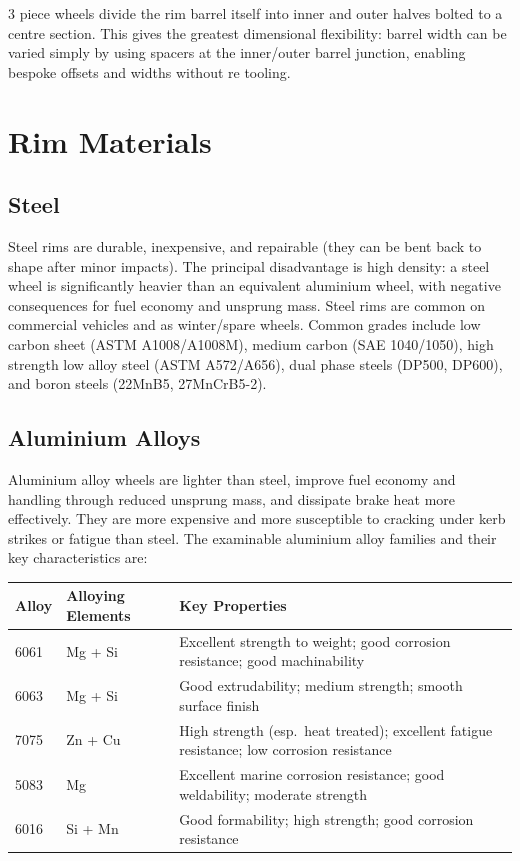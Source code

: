 \documentclass[10pt,a4paper]{article}
\begin{document}
3 piece wheels divide the rim barrel itself into inner and outer halves bolted to a centre section. This gives the greatest dimensional flexibility: barrel width can be varied simply by using spacers at the inner/outer barrel junction, enabling bespoke offsets and widths without re tooling.

\section{Rim Materials}

\subsection{Steel}

Steel rims are durable, inexpensive, and repairable (they can be bent back to shape after minor impacts). The principal disadvantage is high density: a steel wheel is significantly heavier than an equivalent aluminium wheel, with negative consequences for fuel economy and unsprung mass. Steel rims are common on commercial vehicles and as winter/spare wheels. Common grades include low carbon sheet (ASTM A1008/A1008M), medium carbon (SAE 1040/1050), high strength low alloy steel (ASTM A572/A656), dual phase steels (DP500, DP600), and boron steels (22MnB5, 27MnCrB5-2).

\subsection{Aluminium Alloys}

Aluminium alloy wheels are lighter than steel, improve fuel economy and handling through reduced unsprung mass, and dissipate brake heat more effectively. They are more expensive and more susceptible to cracking under kerb strikes or fatigue than steel. The examinable aluminium alloy families and their key characteristics are:

\begin{center}\small
\begin{tabular}{@{}lll@{}}
\toprule
Alloy & Alloying Elements & Key Properties \\
\midrule
6061 & Mg + Si & Excellent strength to weight; good corrosion resistance; good machinability \\
6063 & Mg + Si & Good extrudability; medium strength; smooth surface finish \\
7075 & Zn + Cu & High strength (esp.\ heat treated); excellent fatigue resistance; low corrosion resistance \\
5083 & Mg & Excellent marine corrosion resistance; good weldability; moderate strength \\
6016 & Si + Mn & Good formability; high strength; good corrosion resistance \\
\bottomrule
\end{tabular}
\end{center}
\end{document}
